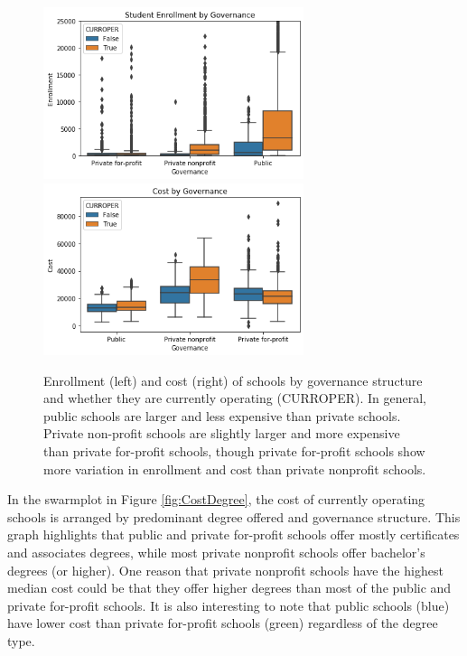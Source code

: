 \documentclass[11pt, letterpaper]{article}
\begin{document}
\begin{figure}[h]
\begin{center}
\includegraphics[width=3in]{currentUGDSControlBox.png}
\includegraphics[width=3in]{currentCostGovBox.png}
\caption{Enrollment (left) and cost (right) of schools by governance structure and whether they are currently operating (CURROPER).  In general, public schools are larger and less expensive than private schools. Private non-profit schools are slightly larger and more expensive than private for-profit schools, though private for-profit schools show more variation in enrollment and cost than private nonprofit schools.}
\label{fig:Control}
\end{center}
\end{figure}

In the swarmplot in Figure \ref{fig:CostDegree}, the cost of currently operating schools is arranged by predominant degree offered and governance structure. This graph highlights that public and private for-profit schools offer mostly certificates and associates degrees, while most private nonprofit schools offer bachelor's degrees (or higher). One reason that private nonprofit schools have the highest median cost could be that they offer higher degrees than most of the public and private for-profit schools. It is also interesting to note that public schools (blue) have lower cost than private for-profit schools (green) regardless of the degree type.
\end{document}
